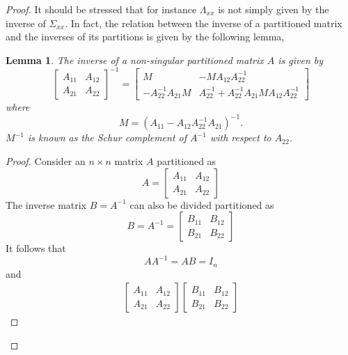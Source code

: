 \documentclass{article}
\newtheorem{lem}[thm]{Lemma}
\theoremstyle{definition}
\theoremstyle{remark}
\begin{document}
\begin{proof}

It should be stressed that for instance $\Lambda_{xx}$ is not simply given by the inverse of $\Sigma_{xx}$. In fact, the relation between the inverse of a partitioned matrix and the inverses of its partitions is given by the following lemma,

\begin{lem}
The inverse of a non-singular partitioned matrix $A$ is given by
$$\begin{bmatrix}
A_{11} & A_{12}\\ 
A_{21} & A_{22}
\end{bmatrix}^{-1}=
\begin{bmatrix}
M & -MA_{12}A_{22}^{-1}\\ 
-A_{22}^{-1}A_{21}M & A_{22}^{-1}+A_{22}^{-1}A_{21}MA_{12}A_{22}^{-1}
\end{bmatrix}$$
where 
$$M=\left( A_{11}-A_{12}A_{22}^{-1}A_{21} \right)^{-1}.$$
$M^{-1}$ is known as the \emph{Schur complement} of $A^{-1}$ with respect to $A_{22}$.
\end{lem}
\begin{proof}
Consider an $n \times n$ matrix $A$ partitioned as
$$A=\begin{bmatrix}
A_{11} & A_{12}\\ 
A_{21} & A_{22}
\end{bmatrix}$$
The inverse matrix $B=A^{-1}$ can also be divided partitioned as
$$
B=A^{-1}=\begin{bmatrix}
B_{11} & B_{12}\\ 
B_{21} & B_{22}
\end{bmatrix}$$
It follows that
$$AA^{-1}=AB=I_n$$ and
\begin{align*}
\begin{bmatrix}
A_{11} & A_{12}\\ 
A_{21} & A_{22}
\end{bmatrix}
\begin{bmatrix}
B_{11} & B_{12}\\ 
B_{21} & B_{22}
\end{bmatrix}

\end{align*}
\end{proof}
\end{proof}
\end{document}

